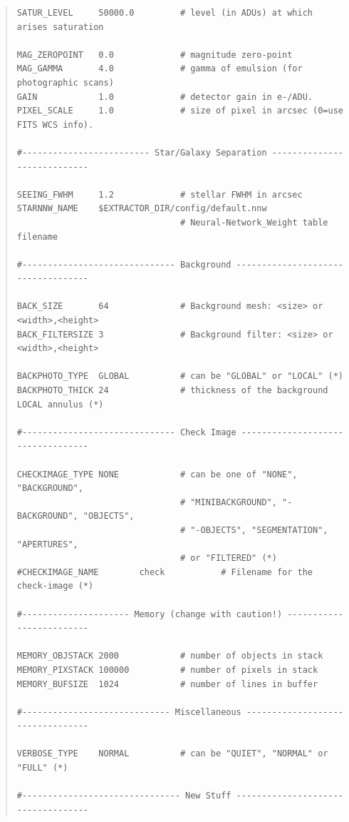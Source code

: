 \documentclass[twoside,11pt]{article}
\renewcommand{\_}{\texttt{\symbol{95}}}
\begin{document}
\begin{quote}
\begin{verbatim}
SATUR_LEVEL     50000.0         # level (in ADUs) at which arises saturation

MAG_ZEROPOINT   0.0             # magnitude zero-point
MAG_GAMMA       4.0             # gamma of emulsion (for photographic scans)
GAIN            1.0             # detector gain in e-/ADU.
PIXEL_SCALE     1.0             # size of pixel in arcsec (0=use FITS WCS info).

#------------------------- Star/Galaxy Separation ----------------------------

SEEING_FWHM     1.2             # stellar FWHM in arcsec
STARNNW_NAME    $EXTRACTOR_DIR/config/default.nnw
                                # Neural-Network_Weight table filename

#------------------------------ Background -----------------------------------

BACK_SIZE       64              # Background mesh: <size> or <width>,<height>
BACK_FILTERSIZE 3               # Background filter: <size> or <width>,<height>

BACKPHOTO_TYPE  GLOBAL          # can be "GLOBAL" or "LOCAL" (*)
BACKPHOTO_THICK 24              # thickness of the background LOCAL annulus (*)

#------------------------------ Check Image ----------------------------------

CHECKIMAGE_TYPE NONE            # can be one of "NONE", "BACKGROUND",
                                # "MINIBACKGROUND", "-BACKGROUND", "OBJECTS",
                                # "-OBJECTS", "SEGMENTATION", "APERTURES",
                                # or "FILTERED" (*)
#CHECKIMAGE_NAME        check           # Filename for the check-image (*)

#--------------------- Memory (change with caution!) -------------------------

MEMORY_OBJSTACK 2000            # number of objects in stack
MEMORY_PIXSTACK 100000          # number of pixels in stack
MEMORY_BUFSIZE  1024            # number of lines in buffer

#----------------------------- Miscellaneous ---------------------------------

VERBOSE_TYPE    NORMAL          # can be "QUIET", "NORMAL" or "FULL" (*)

#------------------------------- New Stuff -----------------------------------
\end{verbatim}\end{quote}
\normalsize

\end{document}
